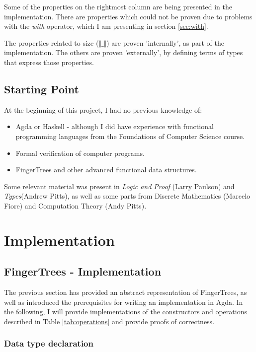 \documentclass[12pt,twoside,notitlepage]{report}
\begin{document}
Some of the properties on the rightmost column are being presented in the implementation. There are properties which could not be proven due to problems with the \textit{with} operator, which I am presenting in section \ref{sec:with}.

The properties related to size ($\Vert\_\Vert$) are proven 'internally', as part of the implementation. The others are proven 'externally', by defining terms of types that express those properties. 

\section{Starting Point}

At the beginning of this project, I had no previous knowledge of:
\begin{itemize}
 \item Agda or Haskell - although I did have experience with functional programming languages from the Foundations of Computer Science course.
 \item Formal verification of computer programs.
 \item FingerTrees and other advanced functional data structures.
\end{itemize}

Some relevant material was present in \textit{Logic and Proof} (Larry Paulson) and \textit{Types}(Andrew Pitts), as well as some parts from Discrete Mathematics (Marcelo Fiore) and Computation Theory (Andy Pitts). 

\chapter{Implementation}

\section{FingerTrees - Implementation}

The previous section has provided an abstract representation of FingerTrees, as well as introduced the prerequisites for writing an implementation in Agda. In the following, I will provide implementations of the constructors and operations described in Table \ref{tab:operations} and provide proofs of correctness. 


\subsection{Data type declaration}
\end{document}
